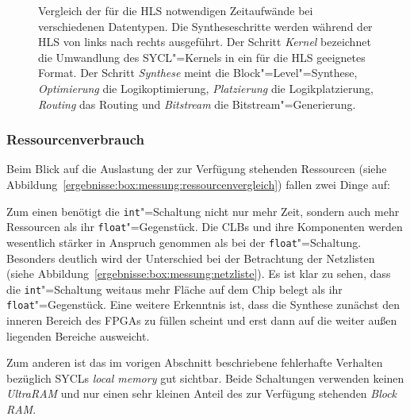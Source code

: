 \begin{figure}[htb]
    \caption[Vergleich der für die HLS notwendigen Zeitaufwände bei
             verschiedenen Datentypen]{Vergleich der für die HLS notwendigen
             Zeitaufwände bei verschiedenen Datentypen. Die Syntheseschritte
             werden während der HLS von links nach rechts ausgeführt. Der
             Schritt \textit{Kernel} bezeichnet die Umwandlung des SYCL"=Kernels
             in ein für die HLS geeignetes Format. Der Schritt \textit{Synthese}
             meint die Block"=Level"=Synthese, \textit{Optimierung} die
             Logikoptimierung, \textit{Platzierung} die Logikplatzierung,
             \textit{Routing} das Routing und \textit{Bitstream} die
             Bitstream"=Generierung.}
    \label{ergebnisse:box:messung:zeitvergleich}
\end{figure}

\subsubsection{Ressourcenverbrauch}

Beim Blick auf die Auslastung der zur Verfügung stehenden Ressourcen (siehe
Abbildung~\ref{ergebnisse:box:messung:ressourcenvergleich}) fallen zwei Dinge
auf:

Zum einen benötigt die \texttt{int}"=Schaltung nicht nur mehr Zeit, sondern auch
mehr Ressourcen als ihr \texttt{float}"=Gegenstück. Die CLBs und ihre
Komponenten werden wesentlich stärker in Anspruch genommen als bei der
\texttt{float}"=Schaltung. Besonders deutlich wird der Unterschied bei der
Betrachtung der Netzlisten (siehe
Abbildung~\ref{ergebnisse:box:messung:netzliste}). Es ist klar zu sehen, dass
die \texttt{int}"=Schaltung weitaus mehr Fläche auf dem Chip belegt als ihr
\texttt{float}"=Gegenstück. Eine weitere Erkenntnis ist, dass die Synthese
zunächst den inneren Bereich des FPGAs zu füllen scheint und erst dann auf die
weiter außen liegenden Bereiche ausweicht.

Zum anderen ist das im vorigen Abschnitt beschriebene fehlerhafte Verhalten
bezüglich SYCLs \textit{local memory} gut sichtbar. Beide Schaltungen verwenden
keinen \textit{UltraRAM} und nur einen sehr kleinen Anteil des zur Verfügung
stehenden \textit{Block RAM}.

